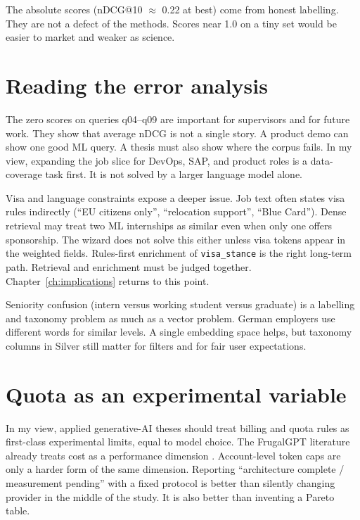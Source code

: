 The absolute scores (nDCG@10 $\approx$ 0.22 at best) come from honest labelling. They are not a defect of the methods. Scores near 1.0 on a tiny set would be easier to market and weaker as science.

\section{Reading the error analysis}
\label{sec:error-discussion}

The zero scores on queries q04--q09 are important for supervisors and for future work. They show that average nDCG is not a single story. A product demo can show one good ML query. A thesis must also show where the corpus fails. In my view, expanding the job slice for DevOps, SAP, and product roles is a data-coverage task first. It is not solved by a larger language model alone.

Visa and language constraints expose a deeper issue. Job text often states visa rules indirectly (``EU citizens only'', ``relocation support'', ``Blue Card''). Dense retrieval may treat two ML internships as similar even when only one offers sponsorship. The wizard does not solve this either unless visa tokens appear in the weighted fields. Rules-first enrichment of \texttt{visa\_stance} is the right long-term path. Retrieval and enrichment must be judged together. Chapter~\ref{ch:implications} returns to this point.

Seniority confusion (intern versus working student versus graduate) is a labelling and taxonomy problem as much as a vector problem. German employers use different words for similar levels. A single embedding space helps, but taxonomy columns in Silver still matter for filters and for fair user expectations.

\section{Quota as an experimental variable}
\label{sec:quota}

In my view, applied generative-AI theses should treat billing and quota rules as first-class experimental limits, equal to model choice. The FrugalGPT literature already treats cost as a performance dimension . Account-level token caps are only a harder form of the same dimension. Reporting ``architecture complete / measurement pending'' with a fixed protocol is better than silently changing provider in the middle of the study. It is also better than inventing a Pareto table.

